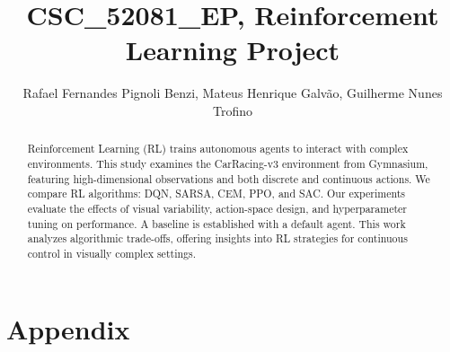 \documentclass[journal, a4paper]{IEEEtran}
\begin{document}
\title{CSC\_52081\_EP, Reinforcement Learning Project}

\author{Rafael Fernandes Pignoli Benzi, Mateus Henrique Galvão, Guilherme Nunes Trofino}
\maketitle


\begin{abstract}
    Reinforcement Learning (RL) trains autonomous agents to interact with complex environments. This study examines the CarRacing-v3 environment from Gymnasium, featuring high-dimensional observations and both discrete and continuous actions. We compare RL algorithms: DQN, SARSA, CEM, PPO, and SAC. Our experiments evaluate the effects of visual variability, action-space design, and hyperparameter tuning on performance. A baseline is established with a default agent. This work analyzes algorithmic trade-offs, offering insights into RL strategies for continuous control in visually complex settings.
\end{abstract}







\newpage
\section*{Appendix}
\end{document}
